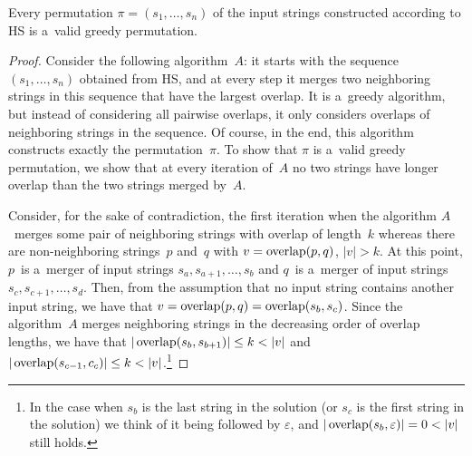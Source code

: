 \begin{theorem}
\label{thm:gr_im_wghc}
Every permutation $\pi=(s_1, \dots, s_n)$ of the input strings constructed according to HS is a~valid greedy permutation.
\end{theorem}
\begin{proof}
Consider the following algorithm~$A$: it starts with the sequence $(s_1, \dots, s_n)$ obtained from HS, and at every step it merges two neighboring strings in this sequence that have the largest overlap. It is a~greedy algorithm, but instead of considering all pairwise overlaps, it only considers overlaps of neighboring strings in the sequence. Of course, in the end, this algorithm constructs exactly the permutation~$\pi$. To show that $\pi$ is a~valid greedy permutation, we show that at every iteration of~$A$ no two strings have longer overlap than the two strings merged by~$A$.

Consider, for the sake of contradiction, the first iteration when the algorithm $A$~merges some pair of neighboring strings with overlap of length~$k$ whereas there are non-neighboring strings~$p$ and~$q$ with $v=\operatorname{overlap}(p,q)$, $|v|>k$. 
At this point, $p$~is a~merger of input strings $s_a, s_{a+1}, \dotsc, s_b$
and $q$~is a~merger of input strings $s_c, s_{c+1}, \dotsc, s_d$. 
Then, from the assumption that no input string contains another input string, we have that $v=\operatorname{overlap}(p,q)=\operatorname{overlap}(s_b,s_c)$. Since the algorithm~$A$
merges neighboring strings in the decreasing order of overlap lengths, we have that $|\overlap(s_b,s_{b+1})| \le k <|v|$ and $|\operatorname{overlap}(s_{c-1},c_c)| \le k < |v|$.\footnote{In the case when $s_b$ is the last string in the solution (or $s_c$ is the first string in the solution) we think of it being followed by $\varepsilon$, and $|\overlap(s_b,\varepsilon)|=0<|v|$ still holds.} 


\end{proof}
